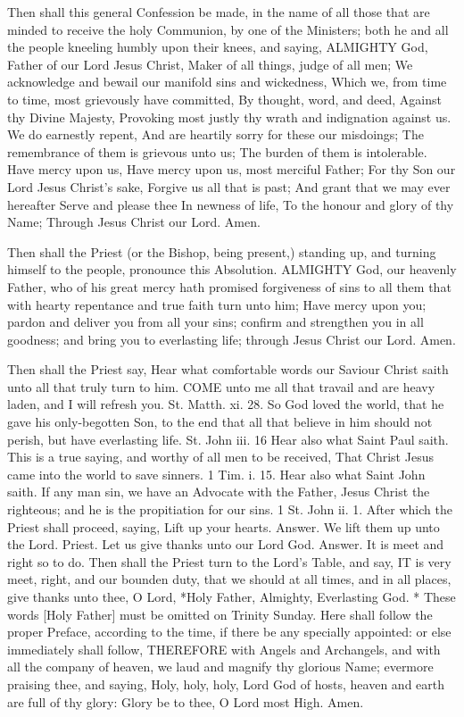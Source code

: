 Then shall this general Confession be made, in the name of all those that are minded to receive the holy Communion, by one of the Ministers; both he and all the people kneeling humbly upon their knees, and saying,
ALMIGHTY God, Father of our Lord Jesus Christ, Maker of all things, judge of all men; We acknowledge and bewail our manifold sins and wickedness, Which we, from time to time, most grievously have committed, By thought, word, and deed, Against thy Divine Majesty, Provoking most justly thy wrath and indignation against us. We do earnestly repent, And are heartily sorry for these our misdoings; The remembrance of them is grievous unto us; The burden of them is intolerable. Have mercy upon us, Have mercy upon us, most merciful Father; For thy Son our Lord Jesus Christ's sake, Forgive us all that is past; And grant that we may ever hereafter Serve and please thee In newness of life, To the honour and glory of thy Name; Through Jesus Christ our Lord. Amen.

Then shall the Priest (or the Bishop, being present,) standing up, and turning himself to the people, pronounce this Absolution.
ALMIGHTY God, our heavenly Father, who of his great mercy hath promised forgiveness of sins to all them that with hearty repentance and true faith turn unto him; Have mercy upon you; pardon and deliver you from all your sins; confirm and strengthen you in all goodness; and bring you to everlasting life; through Jesus Christ our Lord. Amen.

Then shall the Priest say,
Hear what comfortable words our Saviour Christ saith unto all that truly turn to him.
COME unto me all that travail and are heavy laden, and I will refresh you. St. Matth. xi. 28.
    So God loved the world, that he gave his only-begotten Son, to the end that all that believe in him should not perish, but have everlasting life. St. John iii. 16
Hear also what Saint Paul saith.
    This is a true saying, and worthy of all men to be received, That Christ Jesus came into the world to save sinners. 1 Tim. i. 15.
Hear also what Saint John saith.
    If any man sin, we have an Advocate with the Father, Jesus Christ the righteous; and he is the propitiation for our sins. 1 St. John ii. 1.
After which the Priest shall proceed, saying,
    Lift up your hearts.
Answer. We lift them up unto the Lord.
Priest. Let us give thanks unto our Lord God.
Answer. It is meet and right so to do.
Then shall the Priest turn to the Lord's Table, and say,
IT is very meet, right, and our bounden duty, that we should at all times, and in all places, give thanks unto thee, O Lord, *Holy Father, Almighty, Everlasting God.
* These words [Holy Father] must be omitted on Trinity Sunday.
Here shall follow the proper Preface, according to the time, if there be any specially appointed: or else immediately shall follow,
THEREFORE with Angels and Archangels, and with all the company of heaven, we laud and magnify thy glorious Name; evermore praising thee, and saying, Holy, holy, holy, Lord God of hosts, heaven and earth are full of thy glory: Glory be to thee, O Lord most High. Amen.


